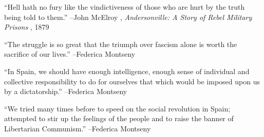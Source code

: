 \documentclass{article}%
\begin{document}
\linebreak%
\vspace{1mm}%
\begin{minipage}{\textwidth}%
\flushleft%
“Hell hath no fury like the vindictiveness of those who are hurt by the truth being told to them.”%
\linebreak%
\vspace{1mm}%
–John McElroy%
, \textit{Andersonville: A Story of Rebel Military Prisons}%
, 1879%
\linebreak%
\vspace{1mm}%
\end{minipage}%
\linebreak%
\vspace{1mm}%
\begin{minipage}{\textwidth}%
\flushleft%
“The struggle is so great that the triumph over fascism alone is worth the sacrifice of our lives.”%
\linebreak%
\vspace{1mm}%
–Federica Montseny%
\linebreak%
\vspace{1mm}%
\end{minipage}%
\linebreak%
\vspace{1mm}%
\begin{minipage}{\textwidth}%
\flushleft%
“In Spain, we should have enough intelligence, enough sense of individual and collective responsibility to do for ourselves that which would be imposed upon us by a dictatorship.”%
\linebreak%
\vspace{1mm}%
–Federica Montseny%
\linebreak%
\vspace{1mm}%
\end{minipage}%
\linebreak%
\vspace{1mm}%
\begin{minipage}{\textwidth}%
\flushleft%
“We tried many times before to speed on the social revolution in Spain; attempted to stir up the feelings of the people and to raise the banner of Libertarian Communism.”%
\linebreak%
\vspace{1mm}%
–Federica Montseny%
\linebreak%
\vspace{1mm}%
\end{minipage}%
\linebreak%
\vspace{1mm}%
\end{document}
